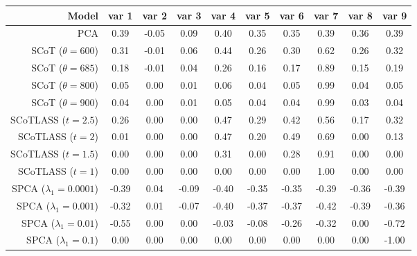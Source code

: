 \begin{tabular}{r|ccccccccc}
\toprule
{Model} &  var 1 &  var 2 &  var 3 &  var 4 &  var 5 &  var 6 &  var 7 &  var 8 &  var 9 \\
\midrule
PCA                         &   0.39 &  -0.05 &   0.09 &   0.40 &   0.35 &   0.35 &   0.39 &   0.36 &   0.39 \\
\midrule
SCoT ($\theta = 600$)       &   0.31 &  -0.01 &   0.06 &   0.44 &   0.26 &   0.30 &   0.62 &   0.26 &   0.32 \\
SCoT ($\theta = 685$)       &   0.18 &  -0.01 &   0.04 &   0.26 &   0.16 &   0.17 &   0.89 &   0.15 &   0.19 \\
SCoT ($\theta = 800$)       &   0.05 &  0.00 &   0.01 &   0.06 &   0.04 &   0.05 &   0.99 &   0.04 &   0.05 \\
SCoT ($\theta = 900$)       &   0.04 &  0.00 &   0.01 &   0.05 &   0.04 &   0.04 &   0.99 &   0.03 &   0.04 \\
\midrule
SCoTLASS ($t = 2.5$)        &   0.26 &  0.00 &   0.00 &   0.47 &   0.29 &   0.42 &   0.56 &   0.17 &   0.32 \\
SCoTLASS ($t = 2$)          &   0.01 &   0.00 &   0.00 &   0.47 &   0.20 &   0.49 &   0.69 &   0.00 &   0.13 \\
SCoTLASS ($t = 1.5$)        &   0.00 &  0.00 &   0.00 &   0.31 &   0.00 &   0.28 &   0.91 &   0.00 &   0.00 \\
SCoTLASS ($t = 1$)          &   0.00 &  0.00 &   0.00 &   0.00 &   0.00 &   0.00 &   1.00 &   0.00 &   0.00 \\
\midrule
SPCA ($\lambda_1 = 0.0001$) &  -0.39 &   0.04 &  -0.09 &  -0.40 &  -0.35 &  -0.35 &  -0.39 &  -0.36 &  -0.39 \\
SPCA ($\lambda_1 = 0.001$)  &  -0.32 &   0.01 &  -0.07 &  -0.40 &  -0.37 &  -0.37 &  -0.42 &  -0.39 &  -0.36 \\
SPCA ($\lambda_1 = 0.01$)   &  -0.55 &   0.00 &   0.00 &  -0.03 &  -0.08 &  -0.26 &  -0.32 &   0.00 &  -0.72 \\
SPCA ($\lambda_1 = 0.1$)    &   0.00 &   0.00 &   0.00 &   0.00 &   0.00 &   0.00 &   0.00 &   0.00 &  -1.00 \\
\bottomrule
\end{tabular}

